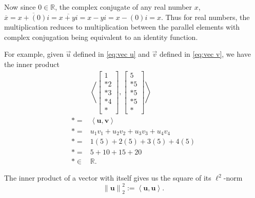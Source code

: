 \documentclass{article}
\begin{document}
Now since $0 \in \mathbb{R}$, the complex conjugate of any real number $x$, $\overline{x} = \overline{x + (0)i} = \overline{x + yi} = x - yi = x - (0)i = x$. Thus for real numbers, the multiplication reduces to multiplication between the parallel elements with complex conjugation being equivalent to an identity function.

For example, given $\vec{u}$ defined in \eqref{eq:vec u} and $\vec{v}$ defined in \eqref{eq:vec v}, we have the inner product
\begin{equation}
    \begin{aligned}
        &\left<
            \left[
                \begin{matrix}
                    1 \\*
                    2 \\*
                    3 \\*
                    4 \\*
                \end{matrix}
            \right]\!,
            \left[
                \begin{matrix}
                    5 \\*
                    5 \\*
                    5 \\*
                    5 \\*
                \end{matrix}
            \right]
        \right> \\*
        ={} & \left<\mathbf{u},\mathbf{v}\right> \\*
        ={} &
                u_1{v_1} +
                u_2{v_2} +
                u_3{v_3} +
                u_4{v_4} \\*
        ={} &
                1(5) +
                2(5) +
                3(5) +
                4(5) \\*
        ={} &
                5 +
                10 +
                15 +
                20 \\*
        \in{} & \mathbb{R}.
    \end{aligned}
\end{equation}

The inner product of a vector with itself gives us the square of its $\ell^2$-norm 
\begin{equation}
    \left\lVert\mathbf{u}\right\rVert_2^2 := \left<\mathbf{u},\mathbf{u}\right>.
\end{equation}
\end{document}
